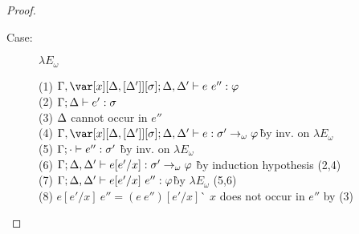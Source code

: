 \begin{proof}
\begin{description}
\begin{tabbing}
\end{tabbing}

\item[Case:] $\lambda E_\omega$
\begin{tabbing}
    (1) $\G, \xD; \D, \D' \vdash e~e'' : \vp$\\
    (2) $\Gamma; \Delta \vdash e' : \sigma$\\
    (3) $\Delta$ cannot occur in $e''$\\
    (4) $\G, \xD; \D, \D' \vdash e : \s' \to_\omega \vp$\` by inv. on $\lambda E_\omega$\\
    (5) $\Gamma; \cdot \vdash e'' : \sigma'$ \` by inv. on $\lambda E_\omega$\\
    (6) $\Gamma; \Delta, \Delta' \vdash e[e'/x] : \sigma' \to_\omega \varphi$ \` by induction hypothesis (2,4)\\
    (7) $\Gamma; \Delta, \Delta' \vdash e[e'/x]~e'' : \varphi$\` by $\lambda E_\omega$ (5,6)\\
    (8) $e[e'/x]~e'' = (e~e'')[e'/x]$\` $x$ does not occur in $e''$ by (3)\\
\end{tabbing}


\end{description}
\end{proof}
